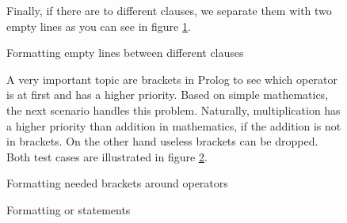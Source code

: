 \documentclass{article}
\begin{document}
\begin{figure}[h]
Finally, if there are to different clauses, we separate them with two empty lines as you can see in figure \ref{lst:diffclauses}.\\

\begin{minipage}{.5\textwidth}

\end{minipage}
\hfill
\begin{minipage}{.5\textwidth}

\end{minipage}

\caption{Formatting empty lines between different clauses}
\label{lst:diffclauses}
\end{figure}

\begin{figure}[h] A very important topic are brackets in Prolog to see which operator is at first and has a higher priority. Based on simple mathematics, the next scenario handles this problem. Naturally, multiplication has a higher priority than addition in mathematics, if the addition is not in brackets. On the other hand useless brackets can be dropped. Both test cases are illustrated in figure \ref{lst:operator_brackets}.\\

\begin{minipage}{.5\textwidth}

\end{minipage}
\hfill
\begin{minipage}{.5\textwidth}

\end{minipage}

\caption{Formatting needed brackets around operators}
\label{lst:operator_brackets}
\end{figure}

\begin{figure}[h]

\begin{minipage}{.5\textwidth}

\end{minipage}
\hfill
\begin{minipage}{.5\textwidth}

\end{minipage}

\caption{Formatting or statements}
\label{lst:or}
\end{figure}
\end{document}
